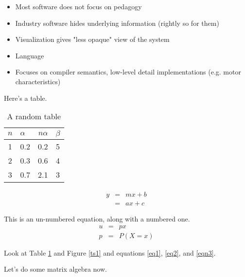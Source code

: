 \begin{itemize}
\item Most software does not focus on pedagogy
\item Industry software hides underlying information (rightly so for them)
\item Visualization gives "less opaque" view of the system
\item Language 
\item Focuses on compiler semantics, low-level detail implementations (e.g. motor characteristics)
\end{itemize}

\lipsum[1]



Here's a table.
\begin{table}[ht]
\begin{center}
\begin{tabular}[ht]{|c|lr|c|} 
\hline
$n$ & $\alpha$ &$n\alpha$ & $\beta$\\
\hline
1 & 0.2 & 0.2 & 5\\
\hline
2 & 0.3 & 0.6 & 4\\
\hline
3 & 0.7 & 2.1 & 3\\
\hline
\end{tabular}
\caption{A random table \label{tab1}}
\end{center}
\end{table}

\begin{eqnarray}
y &=& mx + b \label{eq1}\\
&=& ax+ c
\label{eq2}
\end{eqnarray}

This is an un-numbered equation, along with a numbered one. 
\begin{eqnarray}
u &=& px \nonumber\\
p &=& P(X=x) \label{eqn3}
\end{eqnarray}

Look at Table \ref{tab1} and Figure \ref{ts1} and equations \ref{eq1},  \ref{eq2}, and \ref{eqn3}.

Let's do some matrix algebra now.


